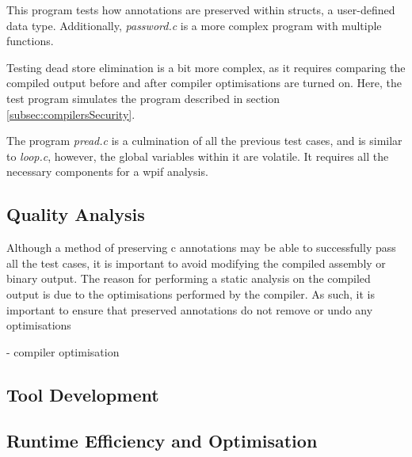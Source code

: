 This program tests how annotations are preserved within structs, a user-defined data type. Additionally, \textit{password.c} is a more complex program with multiple functions.

Testing dead store elimination is a bit more complex, as it requires comparing the compiled output before and after compiler optimisations are turned on. Here, the test program simulates the program described in section \ref{subsec:compilersSecurity}.

The program \textit{pread.c} is a culmination of all the previous test cases, and is similar to \textit{loop.c}, however, the global variables within it are volatile. It requires all the necessary components for a wpif analysis.

\subsection{Quality Analysis}
\label{subsec:qualityAnalysis}
Although a method of preserving c annotations may be able to successfully pass all the test cases, it is important to avoid modifying the compiled assembly or binary output. The reason for performing a static analysis on the compiled output is due to the optimisations performed by the compiler. As such, it is important to ensure that preserved annotations do not remove or undo any optimisations 

- compiler optimisation

\subsection{Tool Development}
\label{subsec:toolDevelopment}

\subsection{Runtime Efficiency and Optimisation}
\label{subsec:runtimeEfficiencyOptimisation}